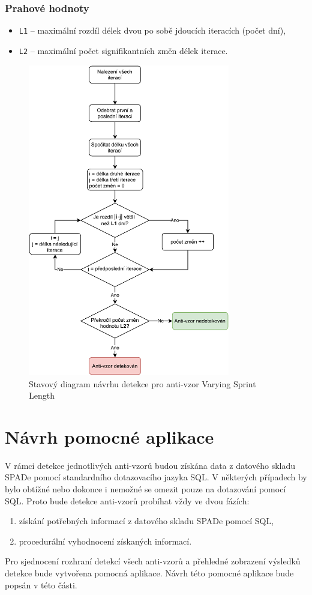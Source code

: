 \documentclass[czech,DP]{thesiskiv}
\begin{document}
\subsubsection{Prahové hodnoty}
\begin{itemize}
    \item \texttt{L1} -- maximální rozdíl délek dvou po sobě jdoucích iteracích (počet dní),
    \item \texttt{L2} -- maximální počet signifikantních změn délek iterace. 
\end{itemize}
\begin{figure}[!htb]
    \centering
    \includegraphics[width=250pt]{img/varying_sprint_length.pdf}
    \caption{Stavový diagram návrhu detekce pro anti-vzor Varying Sprint Length}
    \label{img:varying_sprint_length}
\end{figure}
\FloatBarrier
\section{Návrh pomocné aplikace}\label{sec:app_design}
V rámci detekce jednotlivých anti-vzorů budou získána data z datového skladu SPADe pomocí standardního dotazovacího jazyka SQL. V některých případech by bylo obtížné nebo dokonce i nemožné se omezit pouze na dotazování pomocí SQL. Proto bude detekce anti-vzorů probíhat vždy ve dvou fázích:
\begin{enumerate}
    \item získání potřebných informací z datového skladu SPADe pomocí SQL,
    \item procedurální vyhodnocení získaných informací.
\end{enumerate}
Pro sjednocení rozhraní detekcí všech anti-vzorů a přehledné zobrazení výsledků detekce bude vytvořena pomocná aplikace. Návrh této pomocné aplikace bude popsán v této části.
\end{document}
